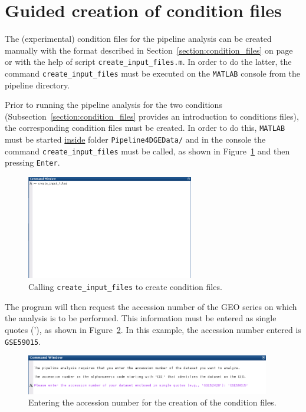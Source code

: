 \documentclass[final,letterpaper,12pt]{article}
\begin{document}
\section{Guided creation of condition files}
\label{section:user_functions}

\par The (experimental) condition files for the pipeline analysis can be created manually with the format described in Section~\ref{section:condition_files} on page \pageref{section:condition_files} or with the help of script \texttt{create\_input\_files.m}. In order to do the latter, the command \texttt{create\_input\_files} must be executed on the \texttt{MATLAB} console from the pipeline directory.

\par Prior to running the pipeline analysis for the two conditions (Subsection~\ref{section:condition_files} provides an introduction to conditions files), the corresponding condition files must be created. In order to do this, \texttt{MATLAB} must be started \underline{inside} folder \texttt{Pipeline4DGEData/} and in the console the command \texttt{create\_input\_files} must be called, as shown in Figure~\ref{fig:create_input_files1} and then pressing \texttt{Enter}.

\begin{figure}
	\centering
	\includegraphics[width=0.65\textwidth]{create_input_files1}
	\caption{Calling \texttt{create\_input\_files} to create condition files.}
	\label{fig:create_input_files1}
\end{figure}

\par The program will then request the accession number of the GEO series on which the analysis is to be performed. This information must be entered as single quotes ('), as shown in  Figure~\ref{fig:create_input_files2}. In this example, the accession number entered is \texttt{GSE59015}.

\begin{figure}
	\centering
	\includegraphics[width=0.95\textwidth]{create_input_files2}
	\caption{Entering the accession number for the creation of the condition files.}
	\label{fig:create_input_files2}
\end{figure}
\end{document}
